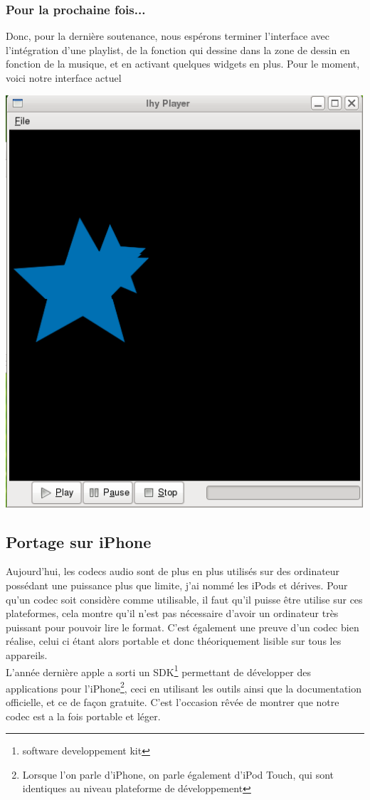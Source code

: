 \documentclass[a4paper,12pt]{article}
\begin{document}
	\subsubsection{Pour la prochaine fois...}
Donc, pour la dernière soutenance, nous espérons terminer l'interface avec
l'intégration d'une playlist, de la fonction qui dessine dans la zone de
dessin en fonction de la musique, et en activant quelques widgets en plus. Pour
le moment, voici notre interface actuel 
\begin{center}
\includegraphics[scale=0.50]{img/Player.png}
\end{center}

\newpage

	\subsection{Portage sur iPhone}
Aujourd'hui, les codecs audio sont de plus en plus utilisés sur des
ordinateur possédant une puissance plus que limite, j'ai nommé les iPods
et dérives. Pour qu'un codec soit considère comme utilisable, il faut
qu'il puisse être utilise sur ces plateformes, cela montre qu'il n'est
pas nécessaire d'avoir un ordinateur très puissant pour pouvoir lire le
format. C'est également une preuve d'un codec bien réalise, celui ci
étant alors portable et donc théoriquement lisible sur tous les
appareils.\\
L'année dernière apple a sorti un SDK\footnote{software developpement
kit} permettant de développer des applications pour l'iPhone\footnote{Lorsque
l'on parle d'iPhone, on parle également d'iPod Touch, qui sont identiques au
niveau plateforme de développement}, ceci en
utilisant les outils ainsi que la documentation officielle, et ce de façon gratuite.
C'est l'occasion rêvée de montrer que notre codec est a la fois
portable et léger.\\
\end{document}
